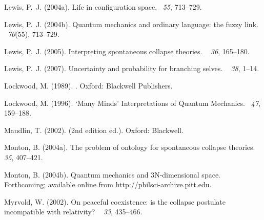 \documentclass[12pt]{article}
\begin{document}
\begin{thebibliography}{}
Lewis, P.~J. (2004a).
\newblock Life in configuration space.
~{\em 55},
  713--729.

Lewis, P.~J. (2004b).
\newblock Quantum mechanics and ordinary language: the fuzzy link.
~{\em 70\/}(55), 713--729.

Lewis, P.~J. (2005).
\newblock Interpreting spontaneous collapse theories.
~{\em
  36}, 165--180.

Lewis, P.~J. (2007).
\newblock Uncertainty and probability for branching selves.
~{\em
  38}, 1--14.

Lockwood, M. (1989).
.
\newblock Oxford: Blackwell Publishers.

Lockwood, M. (1996).
\newblock `{M}any {M}inds' {I}nterpretations of {Q}uantum {M}echanics.
~{\em 47},
  159--188.

Maudlin, T. (2002).
 (2nd edition ed.).
\newblock Oxford: Blackwell.

Monton, B. (2004a).
\newblock The problem of ontology for spontaneous collapse theories.
~{\em
  35}, 407--421.

Monton, B. (2004b).
\newblock Quantum mechanics and 3{N}-dimensional space.
\newblock Forthcoming; available online from http://philsci-archive.pitt.edu.

Myrvold, W. (2002).
\newblock On peaceful coexistence: is the collapse postulate incompatible with
  relativity?
~{\em
  33}, 435--466.


\end{thebibliography}
\end{document}
